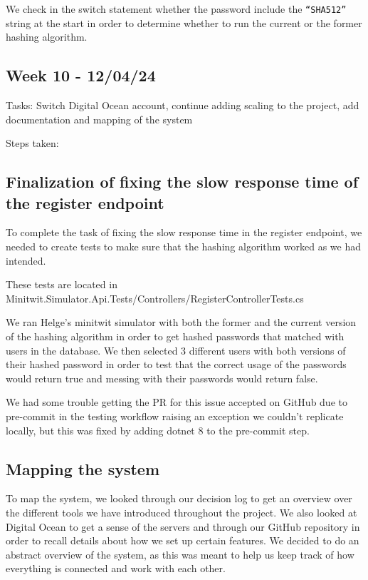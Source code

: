 We check in the switch statement whether the password include the \texttt{“SHA512”} string at the start in order to determine whether to run the current or the former hashing algorithm.

\subsection{Week 10 - 12/04/24}
\label{log:week10}

Tasks: Switch Digital Ocean account, continue adding scaling to the project, add documentation and mapping of the system

Steps taken:

\subsection{Finalization of fixing the slow response time of the register endpoint}
\label{log:finalization-of-fixing-the-slow-response-time-of-the-register-endpoint}

To complete the task of fixing the slow response time in the register endpoint, we needed to create tests to make sure that the hashing algorithm worked as we had intended.

These tests are located in Minitwit.Simulator.Api.Tests/Controllers/RegisterControllerTests.cs

We ran Helge's minitwit simulator with both the former and the current version of the hashing algorithm in order to get hashed passwords that matched with users in the database. We then selected 3 different users with both versions of their hashed password in order to test that the correct usage of the passwords would return true and messing with their passwords would return false.

We had some trouble getting the PR for this issue accepted on GitHub due to pre-commit in the testing workflow raising an exception we couldn't replicate locally, but this was fixed by adding dotnet 8 to the pre-commit step.

\subsection{Mapping the system}
\label{log:mapping-the-system}

To map the system, we looked through our decision log to get an overview over the different tools we have introduced throughout the project. We also looked at Digital Ocean to get a sense of the servers and through our GitHub repository in order to recall details about how we set up certain features. We decided to do an abstract overview of the system, as this was meant to help us keep track of how everything is connected and work with each other.

